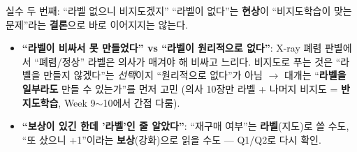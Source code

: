 \begin{frame}{실수 두 번째: ``라벨 없으니 비지도겠지''}
  ``라벨이 없다''는 \textbf{현상}이 ``비지도학습이 맞는 문제''라는
  \textbf{결론}으로 바로 이어지지는 않는다.
  \begin{itemize}
    \item \textbf{``라벨이 비싸서 못 만들었다'' vs ``라벨이
      원리적으로 없다''}: X-ray 폐렴 판별에서 ``폐렴/정상'' 라벨은
      의사가 매겨야 해 비싸고 느리다. 비지도로 푸는 것은 ``라벨을
      만들지 않겠다''는 \emph{선택}이지 ``원리적으로 없다''가 아님
      $\to$ 대개는 ``\textbf{라벨을 일부라도} 만들 수 있는가''를 먼저
      고민 (의사 10장만 라벨 + 나머지 비지도 = \textbf{반지도학습},
      Week 9$\sim$10에서 간접 다룸).
    \item \textbf{``보상이 있긴 한데 '라벨'인 줄 알았다''}:
      ``재구매 여부''는 \textbf{라벨}(지도)로 쓸 수도, ``또 샀으니
      +1''이라는 \textbf{보상}(강화)으로 읽을 수도 --- Q1/Q2로 다시
      확인.
  \end{itemize}
\end{frame}
